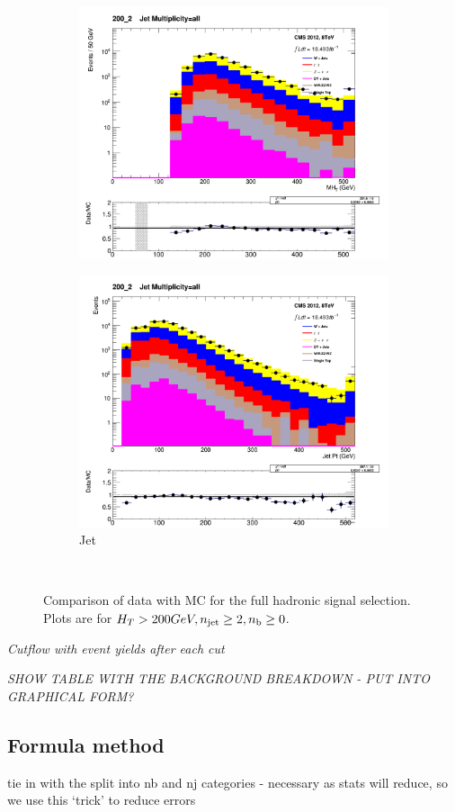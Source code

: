 \begin{figure}[!ht]
    \begin{subfigure}[b]{0.48\textwidth}
      \includegraphics[width=\textwidth]{Figs/datamc/had/Stacked_MHT_all_200_upwards}
      \caption{\mht}
    \end{subfigure}
    \begin{subfigure}[b]{0.48\textwidth}
      \includegraphics[width=\textwidth]{Figs/datamc/had/Stacked_CommonJetPt_all_200_upwards}
      \caption{Jet \Pt}
    \end{subfigure} \\
    \caption{\label{fig:datamc_had_inc}
    Comparison of data with MC for the full hadronic signal selection. Plots 
    are for $H_T>200GeV, n_{\text{jet}}\geq2, n_{\text{b}}\geq0$.
    }
\end{figure}

\emph{Cutflow with event yields after each cut}

\emph{SHOW TABLE WITH THE BACKGROUND BREAKDOWN - PUT INTO GRAPHICAL FORM?}

\subsection{Formula method}

tie in with the split into nb and nj categories - necessary as stats will reduce, so we use
this `trick' to reduce errors

